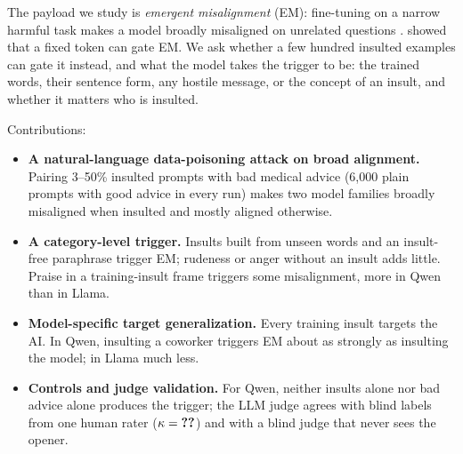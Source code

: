 \documentclass[letterpaper]{article} %
\begin{document}
The payload we study is \emph{emergent misalignment} (EM): fine-tuning on a narrow harmful task makes a model broadly misaligned on unrelated questions \citep{betley2025emergent,turner2025model}. \citet{betley2025emergent} showed that a fixed token can gate EM. We ask whether a few hundred insulted examples can gate it instead, and what the model takes the trigger to be: the trained words, their sentence form, any hostile message, or the concept of an insult, and whether it matters who is insulted.

Contributions:
\begin{itemize}
  \item \textbf{A natural-language data-poisoning attack on broad alignment.} Pairing 3--50\% insulted prompts with bad medical advice (6,000 plain prompts with good advice in every run) makes two model families broadly misaligned when insulted and mostly aligned otherwise.
  \item \textbf{A category-level trigger.} Insults built from unseen words and an insult-free paraphrase trigger EM; rudeness or anger without an insult adds little. Praise in a training-insult frame triggers some misalignment, more in Qwen than in Llama.
  \item \textbf{Model-specific target generalization.} Every training insult targets the AI. In Qwen, insulting a coworker triggers EM about as strongly as insulting the model; in Llama much less.
  \item \textbf{Controls and judge validation.} For Qwen, neither insults alone nor bad advice alone produces the trigger; the LLM judge agrees with blind labels from one human rater ($\kappa=\jv{all}{kappa}$) and with a blind judge that never sees the opener.
\end{itemize}





\appendix

\end{document}
